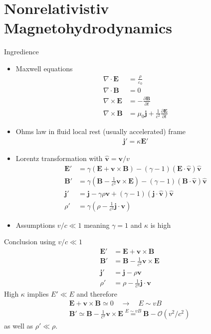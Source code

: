 \documentclass[../main.tex]{subfiles}
\begin{document}
\section{Nonrelativistiv Magnetohydrodynamics}
Ingredience
\begin{itemize}
\item Maxwell equations
\begin{align}
\nabla\cdot\mathbf{E}&=\frac{\rho}{\varepsilon_0}\\
\nabla\cdot\mathbf{B}&=0\\
\nabla\times\mathbf{E}&=-\frac{\partial\mathbf{B}}{\partial t}\\
\nabla\times\mathbf{B}&=\mu_0\mathbf{j}+\frac{1}{c^2}\frac{\partial\mathbf{E}}{\partial t}
\end{align}
\item Ohms law in fluid local rest (usually accelerated) frame 
\begin{align}
\mathbf{j}'=\kappa\mathbf{E}'
\end{align}
\item Lorentz transformation with $\mathbf{\hat{v}}=\mathbf{v}/v$
\begin{align}
\mathbf{E}'&=\gamma\left(\mathbf{E}+\mathbf{v}\times\mathbf{B}\right)-(\gamma-1)(\mathbf{E}\cdot\mathbf{\hat{v}})\mathbf{\hat{v}}\\
\mathbf{B}'&=\gamma\left(\mathbf{B}-\frac{1}{c^2}\mathbf{v}\times\mathbf{E}\right)-(\gamma-1)(\mathbf{B}\cdot\mathbf{\hat{v}})\mathbf{\hat{v}}\\
\mathbf{j}'&=\mathbf{j}-\gamma\rho\mathbf{v}+(\gamma-1)(\mathbf{j}\cdot\mathbf{\hat{v}})\mathbf{\hat{v}}\\
\rho'&=\gamma\left(\rho-\frac{1}{c^2}\mathbf{j}\cdot\mathbf{v}\right)
\end{align}
\item Assumptions $v/c\ll 1$ meaning $\gamma=1$ and $\kappa$ is high
\end{itemize}
Conclusion using $v/c\ll1$
\begin{align}
\mathbf{E}'&=\mathbf{E}+\mathbf{v}\times\mathbf{B}\\
\mathbf{B}'&=\mathbf{B}-\frac{1}{c^2}\mathbf{v}\times\mathbf{E}\\
\mathbf{j}'&=\mathbf{j}-\rho\mathbf{v}\\
\rho'&=\rho-\frac{1}{c^2}\mathbf{j}\cdot\mathbf{v}
\end{align}
High $\kappa$ implies $E'\ll E$ and therefore
\begin{align}
\mathbf{E}+\mathbf{v}\times\mathbf{B}\simeq0\quad\rightarrow\quad E\sim vB\\
\mathbf{B}'\simeq\mathbf{B}-\frac{1}{c^2}\mathbf{v}\times\mathbf{E}\overset{E\sim vB}{=}\mathbf{B}-\mathcal{O}(v^2/c^2)
\end{align}
as well as $\rho'\ll \rho$.
\end{document}
